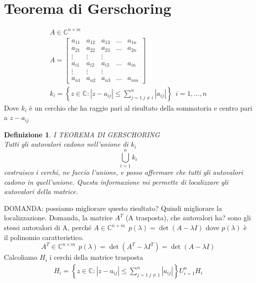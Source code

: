 \documentclass[a4paper, portrait]{book}
\numberwithin{equation}{chapter} %
\newtheorem{definition}{Definizione}
\begin{document}
\section{Teorema di Gerschoring}
\begin{gather}
    A\in \mathbb{C}^{n\times m}\\
    A = \begin{bmatrix}
        a_{11}&a_{12}&a_{13}&\dots&a_{1n}\\
        a_{21}&a_{22}&a_{23}&\dots&a_{2n}\\
        \vdots&\vdots&\vdots\\
        a_{i1}&a_{i2}&a_{i3}&\dots&a_{in}\\
        \vdots&\vdots&\vdots\\
        a_{n1}&a_{n2}&a_{n3}&\dots&a_{nm}
    \end{bmatrix}\\
    k_i = \left\{z \in \mathbb{C}: |z-a_{ij}|\leq \sum_{j=1 \ j \neq i}^n|a_{ij}|\right\} \ \ i = 1,...,n
\end{gather}
Dove $k_i$ è un cerchio che ha raggio pari al risultato della sommatoria e centro pari a $z- a_{ij}$
\begin{definition}
    I TEOREMA DI GERSCHORING\\
    Tutti gli autovalori cadono nell'unione di $k_i$
    \begin{equation}
        \bigcup_{i=1}^n k_i
    \end{equation}
    costruisco i cerchi, ne faccio l'unione, e posso affermare che tutti gli autovalori cadono in quell'unione. Questa informazione mi permette di localizzare gli autovalori della matrice.\\
\end{definition}
DOMANDA: possiamo migliorare questo risultato? Quindi migliorare la localizzazione. Domanda, la matrice $A^T$ (A trasposta), che autovalori ha? sono gli stessi autovalori di A, perché $A \in \mathbb{C}^{n+m} \ \ p(\lambda) = \det(A-\lambda I)$ dove $p(\lambda)$ è il polinomio caratteristico.\\
\begin{equation}
    A^T \in \mathbb{C}^{n\times m} \ \ p(\lambda) = \det(A^T - \lambda I^T) = \det(A - \lambda I)
\end{equation}
Calcoliamo $H_i$ i cerchi della matrice trasposta
\begin{gather}
    H_i = \left\{z \in \mathbb{C}: |z-a_{ij}|\leq \sum_{j=1 \ j\neq 1}^n |a_{ij}|\right\}
    U^n_{i=1} H_i 
\end{gather}
\end{document}
